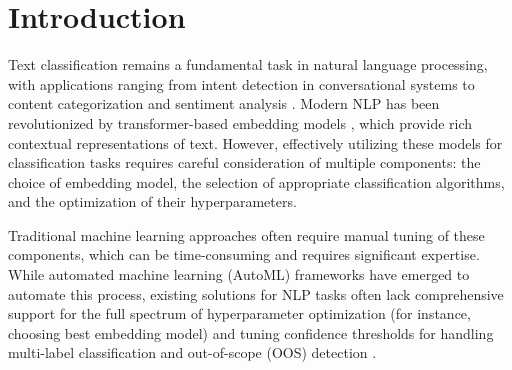 
\maketitle


\begin{abstract}
This report introduces AutoIntent, a novel AutoML framework tailored for text classification tasks. Unlike existing solutions, AutoIntent offers end-to-end automation, encompassing embedding model selection, classifier optimization, and decision threshold tuning, all within a modular, sklearn-like interface. The framework is designed to support multi-label classification and out-of-scope detection, with built-in augmentation tools leveraging large language models. Through extensive experimentation across multiple benchmarks, AutoIntent demonstrates competitive performance. Its support for various transformer backbones, lightweight models, and configurable presets enables users to balance accuracy and resource consumption effectively. This work positions AutoIntent as a promising practical solution for NLP applications.
\end{abstract}




\section{Introduction}

Text classification remains a fundamental task in natural language processing, with applications ranging from intent detection in conversational systems \cite{weld2021surveyjointintentdetection} to content categorization and sentiment analysis \cite{TAHA2024100664}. Modern NLP has been revolutionized by transformer-based embedding models \cite{xiao2024cpackpackedresourcesgeneral}, which provide rich contextual representations of text. However, effectively utilizing these models for classification tasks requires careful consideration of multiple components: the choice of embedding model, the selection of appropriate classification algorithms, and the optimization of their hyperparameters.

Traditional machine learning approaches often require manual tuning of these components, which can be time-consuming and requires significant expertise. While automated machine learning (AutoML) frameworks \cite{baratchi2024automated} have emerged to automate this process, existing solutions for NLP tasks often lack comprehensive support for the full spectrum of hyperparameter optimization (for instance, choosing best embedding model) and tuning confidence thresholds for handling multi-label classification and out-of-scope (OOS) detection \cite{clinc150}.

